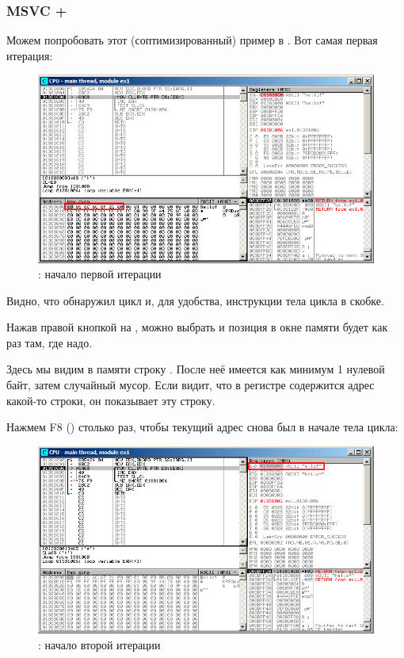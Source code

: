 ﻿\clearpage
\subsubsection{\Optimizing MSVC + \olly}
\myindex{\olly}

Можем попробовать этот (соптимизированный) пример в \olly.  Вот самая первая итерация:

\begin{figure}[H]
\centering
\includegraphics[scale=\FigScale]{patterns/10_strings/1_strlen/olly1.png}
\caption{\olly: начало первой итерации}
\label{fig:strlen_olly_1}
\end{figure}

Видно, что \olly обнаружил цикл и, для удобства,  инструкции тела цикла в скобке.

Нажав правой кнопкой на \EAX, можно выбрать  
и позиция в окне памяти будет как раз там, где надо.

Здесь мы видим в памяти строку .
После неё имеется как минимум 1 нулевой байт, затем случайный мусор.
Если \olly видит, что в регистре содержится адрес какой-то строки, он показывает эту строку.

\clearpage
Нажмем F8 (\stepover) столько раз, чтобы текущий адрес снова был в начале тела цикла:

\begin{figure}[H]
\centering
\includegraphics[scale=\FigScale]{patterns/10_strings/1_strlen/olly2.png}
\caption{\olly: начало второй итерации}
\label{fig:strlen_olly_2}
\end{figure}


